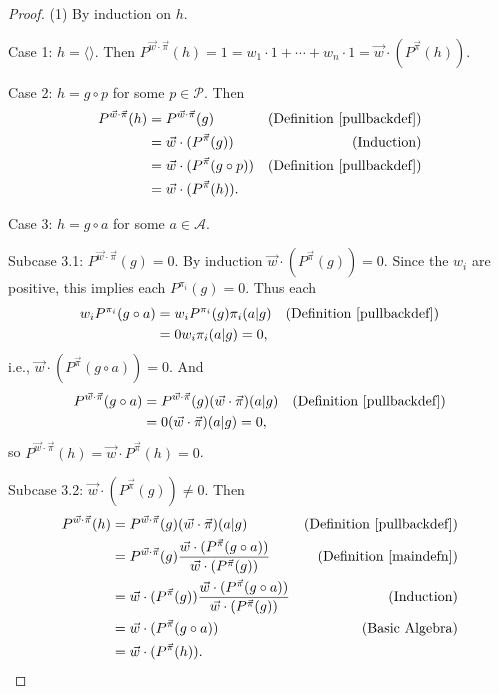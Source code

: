 \documentclass[twoside]{article}
\begin{document}
\begin{proof}
    (1) By induction on $h$.

    Case 1: $h=\langle\rangle$. Then
    $P^{\vec w\cdot\vec\pi}(h)=1=w_1\cdot 1+\cdots+w_n\cdot 1
    =\vec w\cdot ({P^{\vec\pi}}(h))$.

    Case 2: $h=g\circ p$ for some $p\in\mathcal P$. Then
    \begin{align*}
        P^{\vec w\cdot\vec\pi}(h)
            &= P^{\vec w\cdot\vec\pi}(g)
                &\mbox{(Definition \ref{pullbackdef})}\\
            &= \vec w\cdot({P^{\vec\pi}}(g))
                &\mbox{(Induction)}\\
            &= \vec w\cdot({P^{\vec\pi}}(g\circ p))
                &\mbox{(Definition \ref{pullbackdef})}\\
            &= \vec w\cdot({P^{\vec\pi}}(h)).
    \end{align*}

    Case 3: $h=g\circ a$ for some $a\in\mathcal A$.

    Subcase 3.1: $P^{\vec w\cdot\vec\pi}(g)=0$.
        By induction $\vec w\cdot({P^{\vec\pi}}(g))=0$.
        Since the $w_i$ are positive, this implies
        each $P^{\pi_i}(g)=0$.
        Thus each
        \begin{align*}
            w_i P^{\pi_i}(g\circ a)
                &= w_i P^{\pi_i}(g)\pi_i(a|g)
                    &\mbox{(Definition \ref{pullbackdef})}\\
                &= 0w_i\pi_i(a|g)=0,
        \end{align*}
        i.e., $\vec w\cdot({P^{\vec\pi}}(g\circ a))=0$.
        And
        \begin{align*}
            P^{\vec w\cdot\vec\pi}(g\circ a)
                &= P^{\vec w\cdot\vec\pi}(g)(\vec w\cdot\vec\pi)(a|g)
                    &\mbox{(Definition \ref{pullbackdef})}\\
                &= 0(\vec w\cdot\vec\pi)(a|g) = 0,
        \end{align*}
        so $P^{\vec w\cdot\vec\pi}(h)=\vec w\cdot P^{\vec\pi}(h)=0$.

    Subcase 3.2: $\vec w\cdot ({P^{\vec\pi}}(g))\not=0$. Then
    \begin{align*}
        P^{\vec w\cdot\vec\pi}(h)
            &= P^{\vec w\cdot\vec\pi}(g)(\vec w\cdot\vec\pi)(a|g)
                &\mbox{(Definition \ref{pullbackdef})}\\
            &= P^{\vec w\cdot\vec\pi}(g)
                \frac
                {\vec w\cdot({P^{\vec\pi}}(g\circ a))}
                {\vec w\cdot({P^{\vec\pi}}(g))}
                &\mbox{(Definition \ref{maindefn})}\\
            &= \vec w\cdot({P^{\vec\pi}}(g))
                \frac
                {\vec w\cdot({P^{\vec\pi}}(g\circ a))}
                {\vec w\cdot({P^{\vec\pi}}(g))}
                &\mbox{(Induction)}\\
            &= \vec w\cdot({P^{\vec\pi}}(g\circ a))
                &\mbox{(Basic Algebra)}\\
            &= \vec w\cdot({P^{\vec\pi}}(h)).
    \end{align*}


\end{proof}
\end{document}
